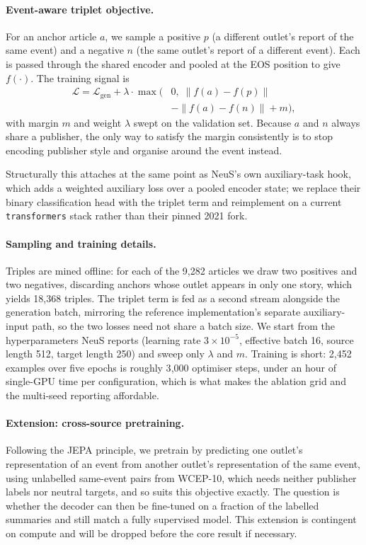 \documentclass[11pt]{article}
\begin{document}
\paragraph{Event-aware triplet objective.} For an anchor article $a$, we sample a
positive $p$ (a different outlet's report of the same event) and a negative
$n$ (the same outlet's report of a different event). Each is passed through the
shared encoder and pooled at the EOS position to give $f(\cdot)$. The training
signal is
\begin{align*}
\mathcal{L} = \mathcal{L}_{\text{gen}} + \lambda \cdot \max\big(&0,\;
  \|f(a)-f(p)\| \\
  &- \|f(a)-f(n)\| + m\big),
\end{align*}
with margin $m$ and weight $\lambda$ swept on the validation set. Because $a$ and
$n$ always share a publisher, the only way to satisfy the margin consistently is
to stop encoding publisher style and organise around the event instead.

Structurally this attaches at the same point as NeuS's own auxiliary-task hook,
which adds a weighted auxiliary loss over a pooled encoder state; we replace
their binary classification head with the triplet term and reimplement on a
current \texttt{transformers} stack rather than their pinned 2021 fork.

\paragraph{Sampling and training details.} Triples are mined offline: for each of
the 9{,}282 articles we draw two positives and two negatives, discarding anchors
whose outlet appears in only one story, which yields 18{,}368 triples. The
triplet term is fed as a second stream alongside the generation batch, mirroring
the reference implementation's separate auxiliary-input path, so the two losses
need not share a batch size. We start from the hyperparameters NeuS reports
(learning rate $3\!\times\!10^{-5}$, effective batch 16, source length 512, target
length 250) and sweep only $\lambda$ and $m$. Training is short: 2{,}452
examples over five epochs is roughly 3{,}000 optimiser steps, under an hour of
single-GPU time per configuration, which is what makes the ablation grid and the
multi-seed reporting affordable.

\paragraph{Extension: cross-source pretraining.} Following the JEPA principle, we
pretrain by predicting one outlet's representation of an event from another
outlet's representation of the same event, using unlabelled same-event pairs from
WCEP-10, which needs neither publisher labels nor neutral targets, and so
suits this objective exactly. The question is whether the decoder can then be
fine-tuned on a fraction of the labelled summaries and still match a fully
supervised model. This extension is contingent on compute and will be dropped
before the core result if necessary.
\end{document}
